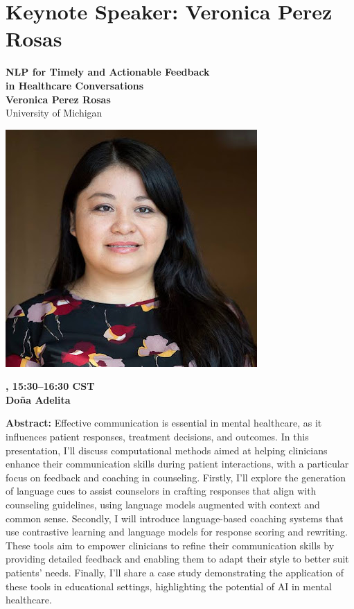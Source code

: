 \newpage
\section{Keynote Speaker: Veronica Perez Rosas}

\begin{center}
{\bfseries\Large NLP for Timely and Actionable Feedback\\\vspace{2.0\lineskip}in Healthcare Conversations} \\
\vspace{1.0em}
{\large\bf Veronica Perez Rosas} \\
University of Michigan

\includegraphics[width=0.4\linewidth]{content/mexican_nlp/veronica.png}

\textbf{\daydateyear{}, 15:30--16:30 CST}\\
\textbf{Do\~na Adelita}
\end{center}

\noindent
{\bfseries Abstract:}
Effective communication is essential in mental healthcare, as it influences patient responses, treatment decisions, and outcomes. In this presentation, I'll discuss computational methods aimed at helping clinicians enhance their communication skills during patient interactions, with a particular focus on feedback and coaching in counseling. Firstly, I'll explore the generation of language cues to assist counselors in crafting responses that align with counseling guidelines, using language models augmented with context and common sense. Secondly, I will introduce language-based coaching systems that use contrastive learning and language models for response scoring and rewriting. These tools aim to empower clinicians to refine their communication skills by providing detailed feedback and enabling them to adapt their style to better suit patients' needs. Finally, I'll share a case study demonstrating the application of these tools in educational settings, highlighting the potential of AI in mental healthcare.

